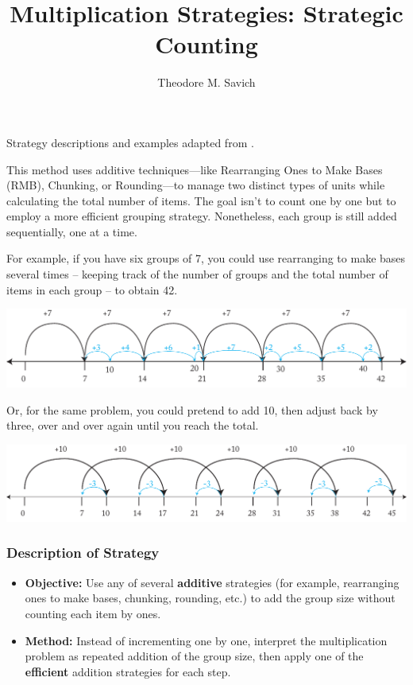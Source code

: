 \documentclass[11pt]{article}
\title{Multiplication Strategies: Strategic Counting}
\author{Theodore M. Savich}
\date{}
\begin{document}
\maketitle

Strategy descriptions and examples adapted from \textcite{HackenbergCourseNotes}. 

This method uses additive techniques—like Rearranging Ones to Make Bases (RMB), Chunking, or Rounding—to manage two distinct types of units while calculating the total number of items. The goal isn’t to count one by one but to employ a more efficient grouping strategy. Nonetheless, each group is still added sequentially, one at a time.


For example, if you have six groups of 7, you could use rearranging to make bases several times -- keeping track of the number of groups and the total number of items in each group -- to obtain 42. 

\includegraphics[width=.8\textwidth]{images/Easy_Pictures/SMR_Multiplication_Strategic_Counting_RMB/PDF/SMR_MULTIPLICATION_Strategic_Counting.pdf}

Or, for the same problem, you could pretend to add 10, then adjust back by three, over and over again until you reach the total.

\includegraphics[width=.8\textwidth]{images/Easy_Pictures/SMR_Multiplication_Strategic_Counting_Rounding/PDF/SMR_Multiplication_Strategic_Counting_Rounding.pdf}






\subsubsection*{Description of Strategy}
\begin{itemize}
    \item \textbf{Objective:} Use any of several \textbf{additive} strategies (for example, rearranging ones to make bases, chunking, rounding, etc.) to add the group size without counting each item by ones.
    \item \textbf{Method:} Instead of incrementing one by one, interpret the multiplication problem as repeated addition of the group size, then apply one of the \textbf{efficient} addition strategies for each step.
\end{itemize}
\end{document}
